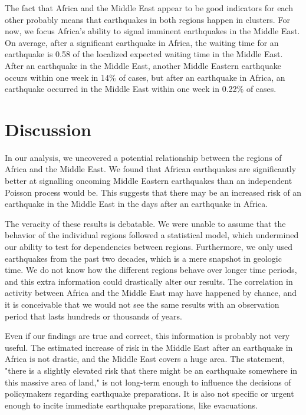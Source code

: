 \documentclass{article}
\begin{document}
The fact that Africa and the Middle East appear to be good indicators for each other probably means that earthquakes in both regions happen in clusters. For now, we focus Africa's ability to signal imminent earthquakes in the Middle East. On average, after a significant earthquake in Africa, the waiting time for an earthquake is 0.58 of the localized expected waiting time in the Middle East. After an earthquake in the Middle East, another Middle Eastern earthquake occurs within one week in 14$\%$ of cases, but after an earthquake in Africa, an earthquake occurred in the Middle East within one week in 0.22$\%$ of cases.

\section{Discussion}

In our analysis, we uncovered a potential relationship between the regions of Africa and the Middle East. We found that African earthquakes are significantly better at signalling oncoming Middle Eastern earthquakes than an independent Poisson process would be. This suggests that there may be an increased risk of an earthquake in the Middle East in the days after an earthquake in Africa. 


The veracity of these results is debatable. We were unable to assume that the behavior of the individual regions followed a statistical model, which undermined our ability to test for dependencies between regions. Furthermore, we only used earthquakes from the past two decades, which is a mere snapshot in geologic time. We do not know how the different regions behave over longer time periods, and this extra information could drastically alter our results. The correlation in activity between Africa and the Middle East may have happened by chance, and it is conceivable that we would not see the same results with an observation period that lasts hundreds or thousands of years.

Even if our findings are true and correct, this information is probably not very useful. The estimated increase of risk in the Middle East after an earthquake in Africa is not drastic, and the Middle East covers a huge area. The statement, "there is a slightly elevated risk that there might be an earthquake somewhere in this massive area of land," is not long-term enough to influence the decisions of policymakers regarding earthquake preparations. It is also not specific or urgent enough to incite immediate earthquake preparations, like evacuations. 
\end{document}
